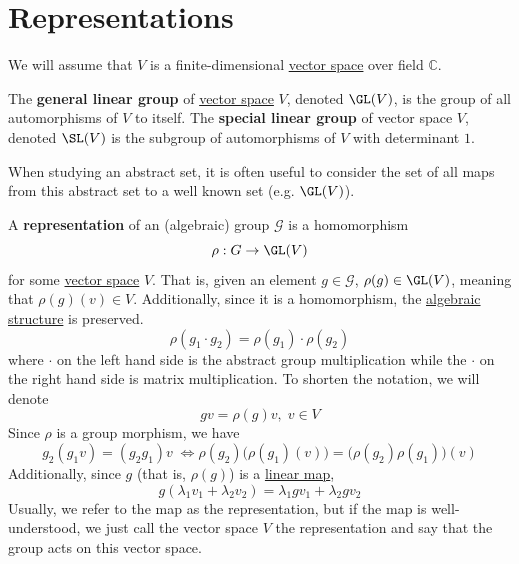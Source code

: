 \section{Representations}

  We will assume that $V$ is a finite-dimensional \hyperref[def:vector-space]{vector space} over field $\mathbb{C}$. 

  \begin{definition}
    \label{def:general-linear-group-of-a-vector-space}
    The \textbf{general linear group} of \hyperref[def:vector-space]{vector space} $V$, denoted $\GL(V)$, is the group of all automorphisms of $V$ to itself. The \textbf{special linear group} of vector space $V$, denoted $\SL(V)$ is the subgroup of automorphisms of $V$ with determinant $1$. 
  \end{definition}

  When studying an abstract set, it is often useful to consider the set of all maps from this abstract set to a well known set (e.g. $\GL(V)$). 

  \begin{definition}[Representation]
    \label{def:representation}
    A \textbf{representation} of an (algebraic) group $\mathcal{G}$ is a homomorphism 
    \begin{equation}
      \rho: G \to \GL(V)
    \end{equation}
    for some \hyperref[def:vector-space]{vector space} $V$. That is, given an element $g \in \mathcal{G}$, $\rho(g) \in \GL (V)$, meaning that $\rho(g)(v) \in V$. Additionally, since it is a homomorphism, the \hyperref[def:algebraic-structure]{algebraic structure} is preserved. 
    \begin{equation}
      \rho(g_1 \cdot g_2) = \rho(g_1) \cdot \rho(g_2)
    \end{equation}
    where $\cdot$ on the left hand side is the abstract group multiplication while the $\cdot$ on the right hand side is matrix multiplication. To shorten the notation, we will denote 
    \begin{equation}
      g v = \rho(g) v, \; v \in V
    \end{equation}
    Since $\rho$ is a group morphism, we have 
    \begin{equation}
      g_2 (g_1 v) = (g_2 g_1) v \; \iff \rho(g_2) \big( \rho(g_1) (v) \big) = \big( \rho(g_2) \rho(g_1) \big) (v)
    \end{equation}
    Additionally, since $g$ (that is, $\rho(g)$) is a \hyperref[thm:linear-map]{linear map}, 
    \begin{equation}
      g(\lambda_1 v_1 + \lambda_2 v_2) = \lambda_1 g v_1 + \lambda_2 g v_2
    \end{equation}
    Usually, we refer to the map as the representation, but if the map is well-understood, we just call the vector space $V$ the representation and say that the group acts on this vector space. 
  \end{definition}

